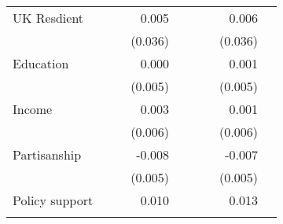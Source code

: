 \documentclass{article}
\begin{document}
\begin{table}[!h]
\begin{tabular}{lllllllll}
\multicolumn{1}{l}{UK Resdient} &
  \multicolumn{1}{r}{} &
  \multicolumn{1}{l}{} &
  \multicolumn{1}{r}{0.005} &
  \multicolumn{1}{l}{} &
  \multicolumn{1}{r}{} &
  \multicolumn{1}{l}{} &
  \multicolumn{1}{r}{0.006} &
  \multicolumn{1}{l}{} \\
\multicolumn{1}{l}{} &
  \multicolumn{1}{r}{} &
  \multicolumn{1}{l}{} &
  \multicolumn{1}{r}{(0.036)} &
  \multicolumn{1}{l}{} &
  \multicolumn{1}{r}{} &
  \multicolumn{1}{l}{} &
  \multicolumn{1}{r}{(0.036)} &
  \multicolumn{1}{l}{} \\
\multicolumn{1}{l}{Education} &
  \multicolumn{1}{r}{} &
  \multicolumn{1}{l}{} &
  \multicolumn{1}{r}{0.000} &
  \multicolumn{1}{l}{} &
  \multicolumn{1}{r}{} &
  \multicolumn{1}{l}{} &
  \multicolumn{1}{r}{0.001} &
  \multicolumn{1}{l}{} \\
\multicolumn{1}{l}{} &
  \multicolumn{1}{r}{} &
  \multicolumn{1}{l}{} &
  \multicolumn{1}{r}{(0.005)} &
  \multicolumn{1}{l}{} &
  \multicolumn{1}{r}{} &
  \multicolumn{1}{l}{} &
  \multicolumn{1}{r}{(0.005)} &
  \multicolumn{1}{l}{} \\
\multicolumn{1}{l}{Income} &
  \multicolumn{1}{r}{} &
  \multicolumn{1}{l}{} &
  \multicolumn{1}{r}{0.003} &
  \multicolumn{1}{l}{} &
  \multicolumn{1}{r}{} &
  \multicolumn{1}{l}{} &
  \multicolumn{1}{r}{0.001} &
  \multicolumn{1}{l}{} \\
\multicolumn{1}{l}{} &
  \multicolumn{1}{r}{} &
  \multicolumn{1}{l}{} &
  \multicolumn{1}{r}{(0.006)} &
  \multicolumn{1}{l}{} &
  \multicolumn{1}{r}{} &
  \multicolumn{1}{l}{} &
  \multicolumn{1}{r}{(0.006)} &
  \multicolumn{1}{l}{} \\
\multicolumn{1}{l}{Partisanship} &
  \multicolumn{1}{r}{} &
  \multicolumn{1}{l}{} &
  \multicolumn{1}{r}{-0.008} &
  \multicolumn{1}{l}{} &
  \multicolumn{1}{r}{} &
  \multicolumn{1}{l}{} &
  \multicolumn{1}{r}{-0.007} &
  \multicolumn{1}{l}{} \\
\multicolumn{1}{l}{} &
  \multicolumn{1}{r}{} &
  \multicolumn{1}{l}{} &
  \multicolumn{1}{r}{(0.005)} &
  \multicolumn{1}{l}{} &
  \multicolumn{1}{r}{} &
  \multicolumn{1}{l}{} &
  \multicolumn{1}{r}{(0.005)} &
  \multicolumn{1}{l}{} \\
\multicolumn{1}{l}{Policy support} &
  \multicolumn{1}{r}{} &
  \multicolumn{1}{l}{} &
  \multicolumn{1}{r}{0.010} &
  \multicolumn{1}{l}{} &
  \multicolumn{1}{r}{} &
  \multicolumn{1}{l}{} &
  \multicolumn{1}{r}{0.013} &
  \multicolumn{1}{l}{} \\
\multicolumn{1}{l}{} &
  \multicolumn{1}{r}{} &
  \multicolumn{1}{l}{} &

\end{tabular}
\end{table}
\end{document}

